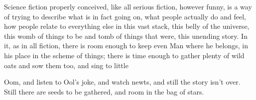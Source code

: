 Science fiction properly conceived, like all
serious fiction, however funny, is a way of trying
to describe what is in fact going on, what people
actually do and feel, how people relate to
everything else in this vast stack, this belly of the
universe, this womb of things to be and tomb of
things that were, this unending story. In it, as in
all fiction, there is room enough to keep even
Man where he belongs, in his place in the scheme
of things; there is time enough to gather plenty of
wild oats and sow them too, and sing to little 

Oom, and listen to Ool’s joke, and watch newts,
and still the story isn’t over. Still there are seeds
to be gathered, and room in the bag of stars.














